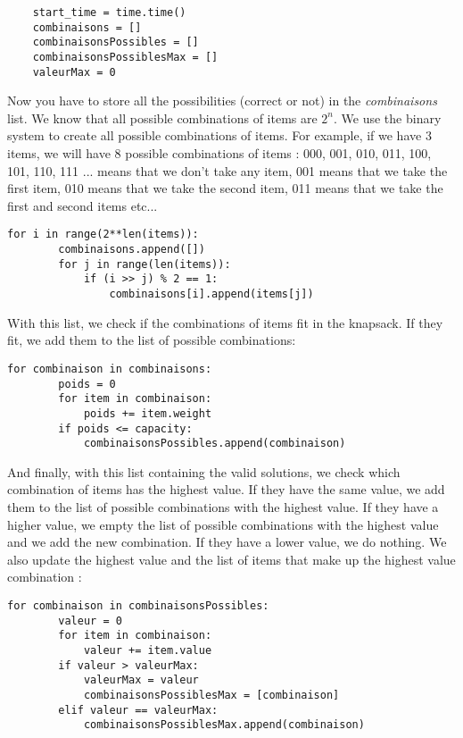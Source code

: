 \documentclass[12pt]{article}
\begin{document}
            \begin{lstlisting}
    start_time = time.time()
    combinaisons = []
    combinaisonsPossibles = []
    combinaisonsPossiblesMax = []
    valeurMax = 0
            \end{lstlisting}

            Now you have to store all the possibilities (correct or not) in the \emph{combinaisons} list. We know that all possible combinations of items are $2^n$. We use the binary system to create all possible combinations of items. For example, if we have 3 items, we will have 8 possible combinations of items : 000, 001, 010, 011, 100, 101, 110, 111 ... means that we don't take any item, 001 means that we take the first item, 010 means that we take the second item, 011 means that we take the first and second items etc...

            \begin{lstlisting}
for i in range(2**len(items)):
        combinaisons.append([])
        for j in range(len(items)):
            if (i >> j) % 2 == 1:
                combinaisons[i].append(items[j])
            \end{lstlisting}

            With this list, we check if the combinations of items fit in the knapsack. If they fit, we add them to the list of possible combinations:

            \begin{lstlisting}
for combinaison in combinaisons:
        poids = 0
        for item in combinaison:
            poids += item.weight
        if poids <= capacity:
            combinaisonsPossibles.append(combinaison)
            \end{lstlisting}

            And finally, with this list containing the valid solutions, we check which combination of items has the highest value. If they have the same value, we add them to the list of possible combinations with the highest value. If they have a higher value, we empty the list of possible combinations with the highest value and we add the new combination. If they have a lower value, we do nothing. We also update the highest value and the list of items that make up the highest value combination :

            \begin{lstlisting}
for combinaison in combinaisonsPossibles:
        valeur = 0
        for item in combinaison:
            valeur += item.value
        if valeur > valeurMax:
            valeurMax = valeur
            combinaisonsPossiblesMax = [combinaison]
        elif valeur == valeurMax:
            combinaisonsPossiblesMax.append(combinaison)
            \end{lstlisting}
\end{document}
